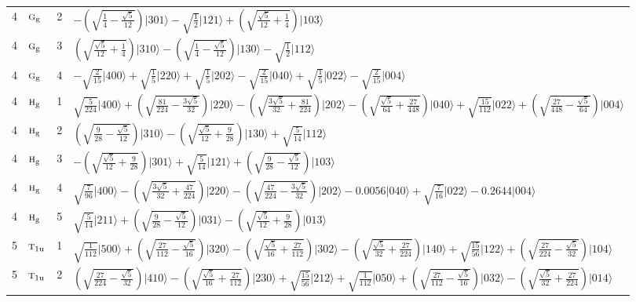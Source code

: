 \documentclass[11pt]{article}
\newcommand{\irr}[1]{\text{\normalfont\scshape #1}}
\newcommand{\ptag}[1]{\mathrm{#1}}
\newcommand{\occ}[1]{\lvert #1\rangle}
\begin{document}
\begin{longtable}{c l c p{}}
4 & $\irr{g}_{\ptag{g}}$ & 2 & $-(\sqrt{\frac{1}{4} - \frac{\sqrt{5}}{12}})\occ{301}-\sqrt{\tfrac{1}{2}}\occ{121}+(\sqrt{\frac{\sqrt{5}}{12} + \frac{1}{4}})\occ{103}$\\
4 & $\irr{g}_{\ptag{g}}$ & 3 & $(\sqrt{\frac{\sqrt{5}}{12} + \frac{1}{4}})\occ{310}-(\sqrt{\frac{1}{4} - \frac{\sqrt{5}}{12}})\occ{130}-\sqrt{\tfrac{1}{2}}\occ{112}$\\
4 & $\irr{g}_{\ptag{g}}$ & 4 & $-\sqrt{\tfrac{2}{15}}\occ{400}+\sqrt{\tfrac{1}{5}}\occ{220}+\sqrt{\tfrac{1}{5}}\occ{202}-\sqrt{\tfrac{2}{15}}\occ{040}+\sqrt{\tfrac{1}{5}}\occ{022}-\sqrt{\tfrac{2}{15}}\occ{004}$\\
4 & $\irr{h}_{\ptag{g}}$ & 1 & $\sqrt{\tfrac{5}{224}}\occ{400}+(\sqrt{\frac{81}{224} - \frac{3 \sqrt{5}}{32}})\occ{220}-(\sqrt{\frac{3 \sqrt{5}}{32} + \frac{81}{224}})\occ{202}-(\sqrt{\frac{\sqrt{5}}{64} + \frac{27}{448}})\occ{040}+\sqrt{\tfrac{15}{112}}\occ{022}+(\sqrt{\frac{27}{448} - \frac{\sqrt{5}}{64}})\occ{004}$\\
4 & $\irr{h}_{\ptag{g}}$ & 2 & $(\sqrt{\frac{9}{28} - \frac{\sqrt{5}}{12}})\occ{310}-(\sqrt{\frac{\sqrt{5}}{12} + \frac{9}{28}})\occ{130}+\sqrt{\tfrac{5}{14}}\occ{112}$\\
4 & $\irr{h}_{\ptag{g}}$ & 3 & $-(\sqrt{\frac{\sqrt{5}}{12} + \frac{9}{28}})\occ{301}+\sqrt{\tfrac{5}{14}}\occ{121}+(\sqrt{\frac{9}{28} - \frac{\sqrt{5}}{12}})\occ{103}$\\
4 & $\irr{h}_{\ptag{g}}$ & 4 & $\sqrt{\tfrac{7}{96}}\occ{400}-(\sqrt{\frac{3 \sqrt{5}}{32} + \frac{47}{224}})\occ{220}-(\sqrt{\frac{47}{224} - \frac{3 \sqrt{5}}{32}})\occ{202}-0.0056\occ{040}+\sqrt{\tfrac{7}{16}}\occ{022}-0.2644\occ{004}$\\
4 & $\irr{h}_{\ptag{g}}$ & 5 & $\sqrt{\tfrac{5}{14}}\occ{211}+(\sqrt{\frac{9}{28} - \frac{\sqrt{5}}{12}})\occ{031}-(\sqrt{\frac{\sqrt{5}}{12} + \frac{9}{28}})\occ{013}$\\
\hline
5 & $\irr{t}_{1\ptag{u}}$ & 1 & $\sqrt{\tfrac{1}{112}}\occ{500}+(\sqrt{\frac{27}{112} - \frac{\sqrt{5}}{16}})\occ{320}-(\sqrt{\frac{\sqrt{5}}{16} + \frac{27}{112}})\occ{302}-(\sqrt{\frac{\sqrt{5}}{32} + \frac{27}{224}})\occ{140}+\sqrt{\tfrac{15}{56}}\occ{122}+(\sqrt{\frac{27}{224} - \frac{\sqrt{5}}{32}})\occ{104}$\\
5 & $\irr{t}_{1\ptag{u}}$ & 2 & $(\sqrt{\frac{27}{224} - \frac{\sqrt{5}}{32}})\occ{410}-(\sqrt{\frac{\sqrt{5}}{16} + \frac{27}{112}})\occ{230}+\sqrt{\tfrac{15}{56}}\occ{212}+\sqrt{\tfrac{1}{112}}\occ{050}+(\sqrt{\frac{27}{112} - \frac{\sqrt{5}}{16}})\occ{032}-(\sqrt{\frac{\sqrt{5}}{32} + \frac{27}{224}})\occ{014}$\\

\end{longtable}
\end{document}

